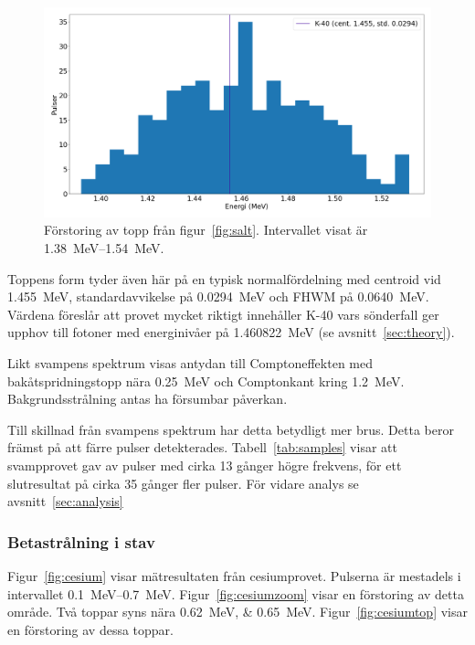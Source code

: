 \begin{figure}[!ht]
    \centering
    \includegraphics[width=\textwidth, keepaspectratio]{../images/salt_top.png}
    \caption{
        Förstoring av topp från figur~\ref{fig:salt}.
        Intervallet visat är \qtyrange{1.38}{1.54}{\MeV}.
    }
    \label{fig:salttop}
\end{figure}

Toppens form tyder även här på en typisk normalfördelning med centroid vid
\qty{1.455}{\MeV}, standardavvikelse på \qty{0.0294}{\MeV} och FHWM på
\qty{0.0640}{\MeV}. Värdena föreslår att provet mycket riktigt innehåller K-40
vars sönderfall ger upphov till fotoner med energinivåer på
\qty{1.460822}{\MeV} (se avsnitt~\ref{sec:theory}).

Likt svampens spektrum visas antydan till Comptoneffekten med
bakåtspridningstopp nära \qty{0.25}{\MeV} och Comptonkant kring
\qty{1.2}{\MeV}. Bakgrundsstrålning antas ha försumbar påverkan.

Till skillnad från svampens spektrum har detta betydligt mer brus. Detta beror
främst på att färre pulser detekterades. Tabell~\ref{tab:samples} visar att
svampprovet gav av pulser med cirka \num{13} gånger högre frekvens, för ett
slutresultat på cirka \num{35} gånger fler pulser. För vidare analys se
avsnitt~\ref{sec:analysis}

\subsubsection{Betastrålning i stav}

Figur~\ref{fig:cesium} visar mätresultaten från cesiumprovet. Pulserna är
mestadels i intervallet \qtyrange{0.1}{0.7}{\MeV}. Figur~\ref{fig:cesiumzoom}
visar en förstoring av detta område. Två toppar syns nära
\qtylist{0.62;0.65}{\MeV}. Figur~\ref{fig:cesiumtop} visar en förstoring av
dessa toppar.

